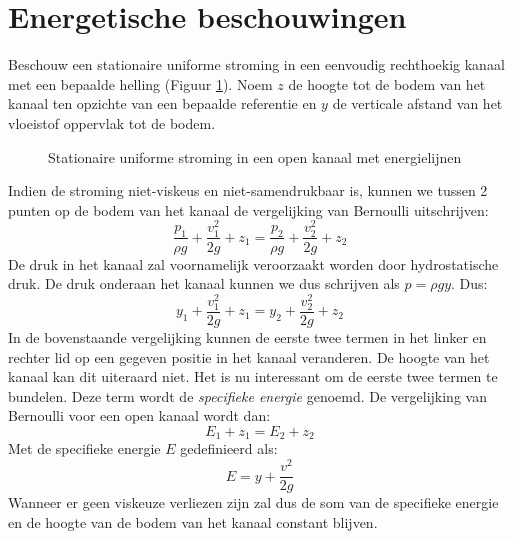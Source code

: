 	\section{Energetische beschouwingen}
	\label{sec:Energetische beschouwingen}
Beschouw een stationaire uniforme stroming in een eenvoudig rechthoekig kanaal met een bepaalde helling (Figuur \ref{fig:Open_kanaal_bernoulli}). Noem $z$ de hoogte tot de bodem van het kanaal ten opzichte van een bepaalde referentie en $y$ de verticale afstand van het vloeistof oppervlak tot de bodem.
\begin{figure}[htb]
	\centering
	
	\caption{Stationaire uniforme stroming in een open kanaal met energielijnen}
	\label{fig:Open_kanaal_bernoulli}
\end{figure}
Indien de stroming niet-viskeus en niet-samendrukbaar is, kunnen we tussen 2 punten op de bodem van het kanaal de vergelijking van Bernoulli uitschrijven:
\begin{equation}
	\frac{p_1}{\rho g} + \frac{v_1^2}{2 g} + z_1 = \frac{p_2}{\rho g} + \frac{v_2^2}{2 g} + z_2
\end{equation}
De druk in het kanaal zal voornamelijk veroorzaakt worden door hydrostatische druk. De druk onderaan het kanaal kunnen we dus schrijven als $p = \rho g y$. Dus:
\begin{equation}
	y_1 + \frac{v_1^2}{2 g} + z_1 = y_2 + \frac{v_2^2}{2 g} + z_2
\end{equation}
In de bovenstaande vergelijking kunnen de eerste twee termen in het linker en rechter lid op een gegeven positie in het kanaal veranderen. De hoogte van het kanaal kan dit uiteraard niet. Het is nu interessant om de eerste twee termen te bundelen. Deze term wordt de \emph{specifieke energie} genoemd. De vergelijking van Bernoulli voor een open kanaal wordt dan:
\begin{equation}
	E_1 + z_1 = E_2 + z_2
\end{equation}
Met de specifieke energie $E$ gedefinieerd als:
\begin{equation}
	E = y + \frac{v^2}{2 g}
\end{equation}
Wanneer er geen viskeuze verliezen zijn zal dus de som van de specifieke energie en de hoogte van de bodem van het kanaal constant blijven.

